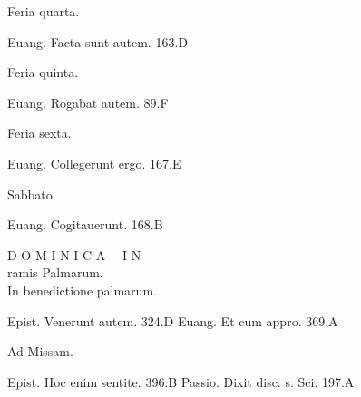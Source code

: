 \documentclass[a5paper,10pt]{book}
\begin{document}
\begin{multicols}{2}
\begin{center}
\color{red} Feria quarta.
\end{center}
\vspace{-.75em}
\par \noindent Euang. Facta sunt autem. \hfill 163.D
\newline \vspace{-1.75em}
\begin{center}
\color{red} Feria quinta.
\end{center}
\vspace{-.75em}
\par \noindent Euang. Rogabat autem. \hfill 89.F
\newline \vspace{-1.75em}
\begin{center}
\color{red} Feria sexta.
\end{center}
\vspace{-.75em}
\par \noindent Euang. Collegerunt ergo. \hfill 167.E
\newline \vspace{-1.75em}
\begin{center}
\color{red} Sabbato.
\end{center}
\vspace{-.75em}
\par \noindent Euang. Cogitauerunt. \hfill 168.B
\par
\begin{center} \color{red}
\large D O M I N I C A \ \ I N\\
\normalsize ramis Palmarum.\\
\vspace{+.5em}
In benedictione palmarum.
\end{center}
\vspace{-.75em}
\par \noindent Epist. Venerunt autem. \hfill 324.D
\newline Euang. Et cum appro. \hfill 369.A
\newline \vspace{-1.75em}
\begin{center}
\color{red} Ad Missam.
\end{center}
\vspace{-.75em}
\par \noindent Epist. Hoc enim sentite. \hfill 396.B
\newline Passio. Dixit disc. s. Sci. \hfill 197.A
\newline \vspace{-1.75em}

\end{multicols}
\end{document}
